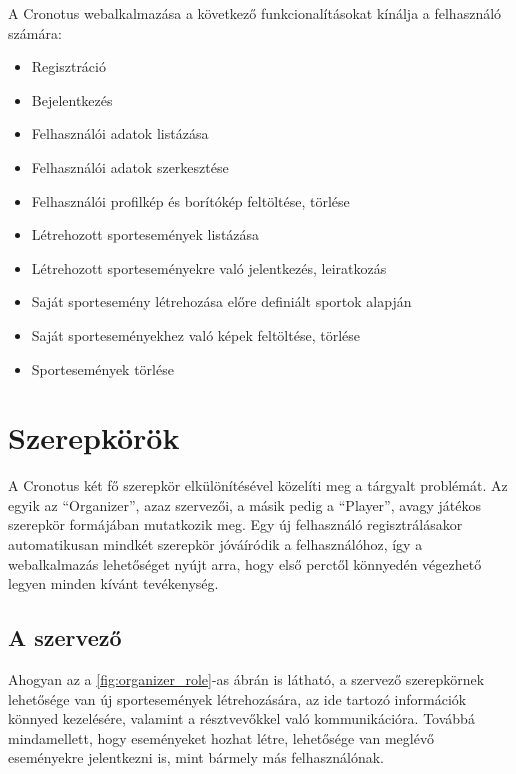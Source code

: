 A Cronotus webalkalmazása a következő funkcionalításokat kínálja a felhasználó számára:

\begin{itemize}
  \item Regisztráció
  \item Bejelentkezés
  \item Felhasználói adatok listázása
  \item Felhasználói adatok szerkesztése
  \item Felhasználói profilkép és borítókép feltöltése, törlése
  \item Létrehozott sportesemények listázása
  \item Létrehozott sporteseményekre való jelentkezés, leiratkozás
  \item Saját sportesemény létrehozása előre definiált sportok alapján
  \item Saját sporteseményekhez való képek feltöltése, törlése
  \item Sportesemények törlése
\end{itemize}

\section{Szerepkörök}

  A Cronotus két fő szerepkör elkülönítésével közelíti meg a tárgyalt problémát. Az egyik az ``Organizer'', azaz szervezői, a másik pedig
  a ``Player'', avagy játékos szerepkör formájában mutatkozik meg. Egy új felhasználó regisztrálásakor automatikusan mindkét szerepkör
  jóváíródik a felhasználóhoz, így a webalkalmazás lehetőséget nyújt arra, hogy első perctől könnyedén végezhető legyen minden kívánt tevékenység.

  \subsection{A szervező}

  Ahogyan az a \ref{fig:organizer_role}-as ábrán is látható, a szervező szerepkörnek lehetősége van új sportesemények létrehozására,
  az ide tartozó információk könnyed kezelésére, valamint a résztvevőkkel való kommunikációra.
  Továbbá mindamellett, hogy eseményeket hozhat létre, lehetősége van meglévő eseményekre jelentkezni is, mint bármely más felhasználónak.

